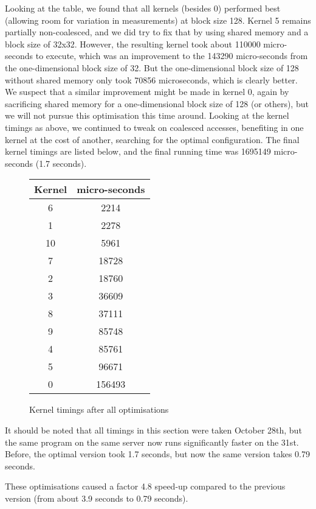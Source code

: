 Looking at the table, we found that all kernels (besides 0) performed best (allowing room for variation in measurements) at block size 128.\n
Kernel 5 remains partially non-coalesced, and we did try to fix that by using shared memory and a block size of 32x32. However, the resulting kernel took about 110000 micro-seconds to execute, which was an improvement to the 143290 micro-seconds from the one-dimensional block size of 32. But the one-dimensional block size of 128 without shared memory only took 70856 microseconds, which is clearly better.\n
We suspect that a similar improvement might be made in kernel 0, again by sacrificing shared memory for a one-dimensional block size of 128 (or others), but we will not pursue this optimisation this time around.\n
Looking at the kernel timings as above, we continued to tweak on coalesced accesses, benefiting in one kernel at the cost of another, searching for the optimal configuration.\n
The final kernel timings are listed below, and the final running time was 1695149 micro-seconds (1.7 seconds).\n


\begin{figure}[H]
    \centering
\begin{tabular}{| c | c |}
    \hline
Kernel & micro-seconds \\
    \hline
6  & 2214 \\
1  & 2278 \\
10 & 5961 \\
7  & 18728 \\
2  & 18760 \\
3  & 36609 \\
8  & 37111 \\
9  & 85748 \\
4  & 85761 \\
5  & 96671 \\
0  & 156493 \\
    \hline
\end{tabular}
\caption{Kernel timings after all optimisations}
\end{figure}

It should be noted that all timings in this section were taken October 28th, but the same program on the same server now runs significantly faster on the 31st. Before, the optimal version took 1.7 seconds, but now the same version takes 0.79 seconds.\n

These optimisations caused a factor 4.8 speed-up compared to the previous version (from about 3.9 seconds to 0.79 seconds).


